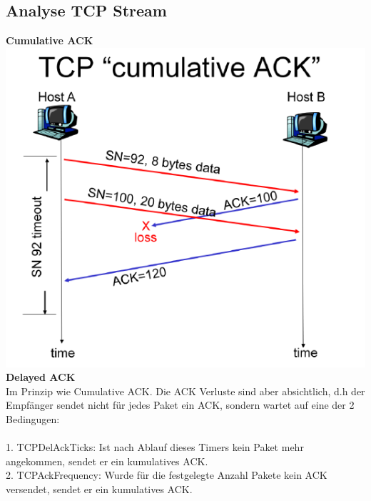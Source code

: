 \subsection{Analyse TCP Stream}
\textbf{Cumulative ACK}\\
\includegraphics[scale=0.5]{media/cumulativeACK.png}\\
\textbf{Delayed ACK}\\
Im Prinzip wie Cumulative ACK. Die ACK Verluste sind aber absichtlich, d.h der Empfänger sendet nicht für jedes Paket ein ACK, sondern wartet auf eine der 2 Bedingugen:\\\\
1. TCPDelAckTicks: Ist nach Ablauf dieses Timers kein Paket mehr angekommen, sendet er ein kumulatives ACK. \\
2. TCPAckFrequency: Wurde für die festgelegte Anzahl Pakete kein ACK versendet, sendet er ein kumulatives ACK.\\

